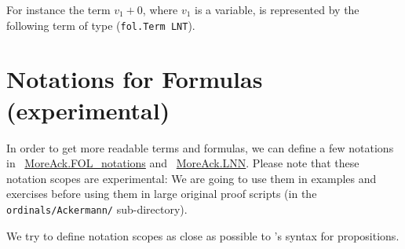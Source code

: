 
















For instance the term $v_1+0$, where $v_1$ is a variable,
is represented by the following \gallina term of type 
(\texttt{fol.Term LNT}).








\section{Notations for Formulas (experimental)}

In order to get more readable terms and formulas, we can define a few notations in ~\href{../theories/html/hydras.MoreAck.FOL_notations.html}{MoreAck.FOL\_notations} and
~\href{../theories/html/hydras.MoreAck.LNN.html}{MoreAck.LNN}.
Please note that these notation scopes are experimental: We are going to use them in examples and exercises before using them in large original proof scripts (in the \texttt{ordinals/Ackermann/} sub-directory).

We try to define notation scopes as close as possible to \coq's syntax for propositions.

